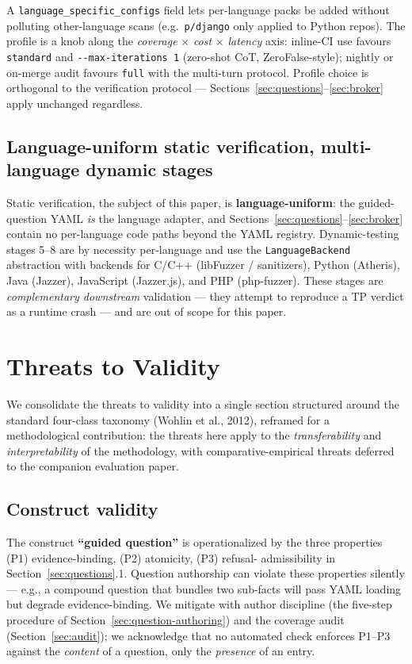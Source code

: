 \documentclass[11pt,a4paper]{article}
\begin{document}
A \texttt{language\_specific\_configs} field lets per-language packs
be added without polluting other-language scans (e.g.~\texttt{p/django}
only applied to Python repos). The profile is a knob along the
\emph{coverage} $\times$ \emph{cost} $\times$ \emph{latency} axis:
inline-CI use favours \texttt{standard} and \verb|--max-iterations 1|
(zero-shot CoT, ZeroFalse-style); nightly or on-merge audit favours
\texttt{full} with the multi-turn protocol. Profile choice is
orthogonal to the verification protocol ---
Sections~\ref{sec:questions}--\ref{sec:broker} apply unchanged
regardless.

\subsection{Language-uniform static verification, multi-language dynamic stages}

Static verification, the subject of this paper, is
\textbf{language-uniform}: the guided-question YAML \emph{is} the
language adapter, and Sections~\ref{sec:questions}--\ref{sec:broker}
contain no per-language code paths beyond the YAML registry.
Dynamic-testing stages 5--8 are by necessity per-language and use the
\texttt{LanguageBackend} abstraction with backends for C/C++
(libFuzzer / sanitizers), Python (Atheris), Java (Jazzer), JavaScript
(Jazzer.js), and PHP (php-fuzzer). These stages are \emph{complementary
downstream} validation --- they attempt to reproduce a TP verdict as a
runtime crash --- and are out of scope for this paper.

\section{Threats to Validity}
\label{sec:threats}

We consolidate the threats to validity into a single section structured
around the standard four-class taxonomy (Wohlin et al., 2012),
reframed for a methodological contribution: the threats here apply to
the \emph{transferability} and \emph{interpretability} of the
methodology, with comparative-empirical threats deferred to the
companion evaluation paper.

\subsection{Construct validity}

The construct \textbf{``guided question''} is operationalized by the
three properties (P1) evidence-binding, (P2) atomicity, (P3) refusal-
admissibility in Section~\ref{sec:questions}.1. Question authorship can
violate these properties silently --- e.g., a compound question that
bundles two sub-facts will pass YAML loading but degrade
evidence-binding. We mitigate with author discipline (the five-step
procedure of Section~\ref{sec:question-authoring}) and the coverage
audit (Section~\ref{sec:audit}); we acknowledge that no automated
check enforces P1--P3 against the \emph{content} of a question, only
the \emph{presence} of an entry.
\end{document}
